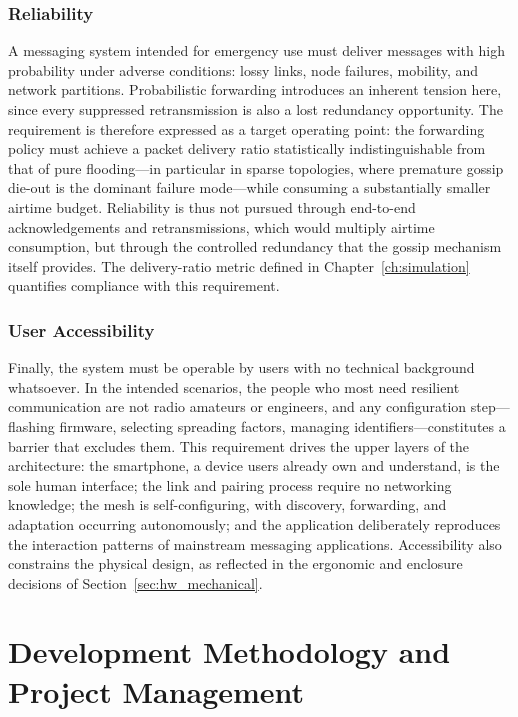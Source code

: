 \documentclass[english,bachelor]{tfgitic}[2026/01/22]
\begin{document}
\subsubsection{Reliability}
\label{subsec:req_reliability}

A messaging system intended for emergency use must deliver messages with high probability under adverse conditions: lossy links, node failures, mobility, and network partitions. Probabilistic forwarding introduces an inherent tension here, since every suppressed retransmission is also a lost redundancy opportunity. The requirement is therefore expressed as a target operating point: the forwarding policy must achieve a packet delivery ratio statistically indistinguishable from that of pure flooding---in particular in sparse topologies, where premature gossip die-out is the dominant failure mode---while consuming a substantially smaller airtime budget. Reliability is thus not pursued through end-to-end acknowledgements and retransmissions, which would multiply airtime consumption, but through the controlled redundancy that the gossip mechanism itself provides. The delivery-ratio metric defined in Chapter~\ref{ch:simulation} quantifies compliance with this requirement.

\subsubsection{User Accessibility}
\label{subsec:req_accessibility}

Finally, the system must be operable by users with no technical background whatsoever. In the intended scenarios, the people who most need resilient communication are not radio amateurs or engineers, and any configuration step---flashing firmware, selecting spreading factors, managing identifiers---constitutes a barrier that excludes them. This requirement drives the upper layers of the architecture: the smartphone, a device users already own and understand, is the sole human interface; the  link and pairing process require no networking knowledge; the mesh is self-configuring, with discovery, forwarding, and adaptation occurring autonomously; and the application deliberately reproduces the interaction patterns of mainstream messaging applications. Accessibility also constrains the physical design, as reflected in the ergonomic and enclosure decisions of Section~\ref{sec:hw_mechanical}.

\section{Development Methodology and Project Management}
\label{ch:methodology}
\end{document}
